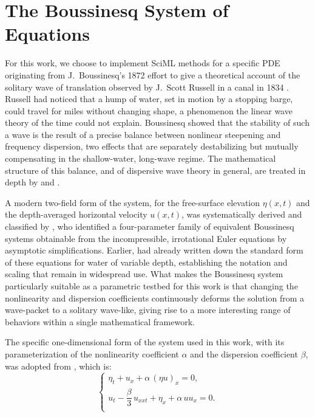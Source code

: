 \section{The Boussinesq System of Equations}
\label{sec:intro_boussinesq}

For this work, we choose to implement SciML methods for a specific PDE originating from J.~Boussinesq's 1872 effort to give a theoretical account of the solitary wave of translation observed by J.~Scott Russell in a canal in 1834 \parencite{boussinesq1872}. Russell had noticed that a hump of water, set in motion by a stopping barge, could travel for miles without changing shape, a phenomenon the linear wave theory of the time could not explain. Boussinesq showed that the stability of such a wave is the result of a precise balance between nonlinear steepening and frequency dispersion, two effects that are separately destabilizing but mutually compensating in the shallow-water, long-wave regime. The mathematical structure of this balance, and of dispersive wave theory in general, are treated in depth by \textcite{whitham1974} and \textcite{debnath2012}.

A modern two-field form of the system, for the free-surface elevation $\eta(x,t)$ and the depth-averaged horizontal velocity $u(x,t)$, was systematically derived and classified by \textcite{bona2002}, who identified a four-parameter family of equivalent Boussinesq systems obtainable from the incompressible, irrotational Euler equations by asymptotic simplifications. Earlier, \textcite{peregrine1967} had already written down the standard form of these equations for water of variable depth, establishing the notation and scaling that remain in widespread use. What makes the Boussinesq system particularly suitable as a parametric testbed for this work is that changing the nonlinearity and dispersion coefficients continuously deforms the solution from a wave-packet to a solitary wave-like, giving rise to a more interesting range of behaviors within a single mathematical framework.

The specific one-dimensional form of the system used in this work, with its parameterization of the nonlinearity coefficient $\alpha$ and the dispersion coefficient $\beta$, was adopted from \textcite{martins2023, martins2024}, which is:
\begin{equation}\label{eq:boussinesq_intro}
\begin{cases}
    \eta_t + u_x + \alpha\,(\eta u)_x = 0, \\[4pt]
    u_t - \dfrac{\beta}{3}\,u_{xxt} + \eta_x + \alpha\,u u_x = 0. \\
\end{cases}
\end{equation}


